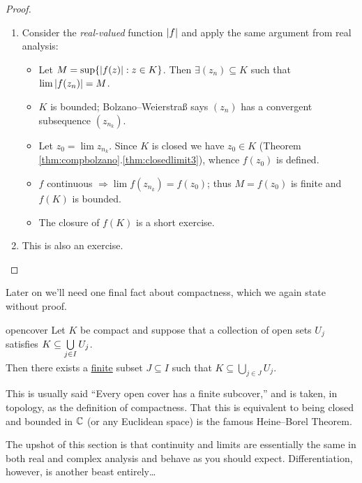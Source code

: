 \begin{proof}{}{}
	\begin{enumerate}
	  \item Consider the \emph{real-valued} function $\left| f\right|$ and apply the same argument from real analysis:
		\begin{itemize}\itemsep0pt
		  \item Let $M=\sup\{\left| f(z)\right|:z\in K\}$. Then $\exists (z_n)\subseteq K$ such that $\lim\left| f(z_n)\right| =M$.
		  \item $K$ is bounded; Bolzano--Weierstraß says $(z_n)$ has a convergent subsequence $(z_{n_k})$.
		  \item Let $z_0=\lim z_{n_k}$. Since $K$ is closed we have $z_0\in K$ (Theorem \ref*{thm:compbolzano}.\ref{thm:closedlimit3}), whence $f(z_0)$ is defined.
		  \item $f$ continuous $\Longrightarrow\lim f(z_{n_k})= f(z_0)$; thus $M=f(z_0)$ is finite and $f(K)$ is bounded.
		  \item The closure of $f(K)$ is a short exercise.
		\end{itemize}
		\item This is also an exercise.\qedhere
	\end{enumerate}
\end{proof}

\goodbreak

Later on we'll need one final fact about compactness, which we again state without proof.

\begin{thm}{}{opencover}
	Let $K$ be compact and suppose that a collection of open sets $U_j$ satisfies $K\subseteq \smash[b]{\bigcup\limits_{j\in I} U_j}$.\par
	Then there exists a \underline{finite} subset $J\subseteq I$ such that $K\subseteq \bigcup\limits_{j\in J} U_j$.
\end{thm}

This is usually said ``Every open cover has a finite subcover,'' and is taken, in topology, as the definition of compactness. That this is equivalent to being closed and bounded in $\mathbb{C}$ (or any Euclidean space) is the famous Heine--Borel Theorem.\smallbreak

The upshot of this section is that continuity and limits are essentially the same in both real and complex analysis and behave as you should expect. Differentiation, however, is another beast entirely\ldots


